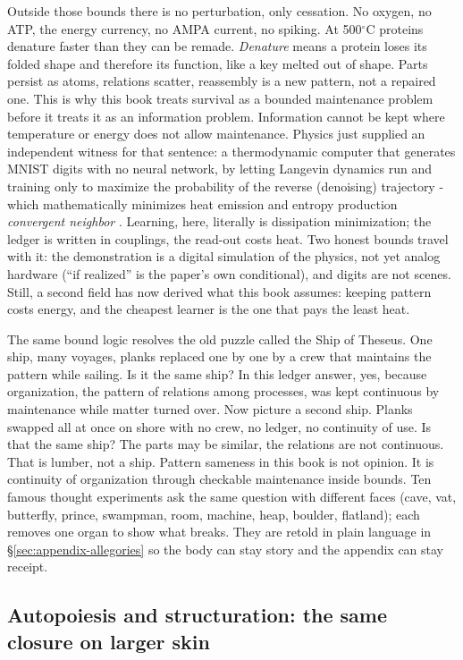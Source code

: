 Outside those bounds there is no perturbation, only cessation. No oxygen, no ATP, the energy currency, no AMPA current, no spiking. At 500$^\circ$C proteins denature faster than they can be remade. \textit{Denature} means a protein loses its folded shape and therefore its function, like a key melted out of shape. Parts persist as atoms, relations scatter, reassembly is a new pattern, not a repaired one. This is why this book treats survival as a bounded maintenance problem before it treats it as an information problem. Information cannot be kept where temperature or energy does not allow maintenance. Physics just supplied an independent witness for that sentence: a thermodynamic computer that generates MNIST digits with no neural network, by letting Langevin dynamics run and training only to maximize the probability of the reverse (denoising) trajectory - which mathematically minimizes heat emission and entropy production \textit{convergent neighbor} \citep{whitelam2025}. Learning, here, literally is dissipation minimization; the ledger is written in couplings, the read-out costs heat. Two honest bounds travel with it: the demonstration is a digital simulation of the physics, not yet analog hardware (``if realized'' is the paper's own conditional), and digits are not scenes. Still, a second field has now derived what this book assumes: keeping pattern costs energy, and the cheapest learner is the one that pays the least heat.

The same bound logic resolves the old puzzle called the Ship of Theseus. One ship, many voyages, planks replaced one by one by a crew that maintains the pattern while sailing. Is it the same ship? In this ledger answer, yes, because organization, the pattern of relations among processes, was kept continuous by maintenance while matter turned over. Now picture a second ship. Planks swapped all at once on shore with no crew, no ledger, no continuity of use. Is that the same ship? The parts may be similar, the relations are not continuous. That is lumber, not a ship. Pattern sameness in this book is not opinion. It is continuity of organization through checkable maintenance inside bounds. Ten famous thought experiments ask the same question with different faces (cave, vat, butterfly, prince, swampman, room, machine, heap, boulder, flatland); each removes one organ to show what breaks. They are retold in plain language in \S\ref{sec:appendix-allegories} so the body can stay story and the appendix can stay receipt.

\subsection*{Autopoiesis and structuration: the same closure on larger skin}

